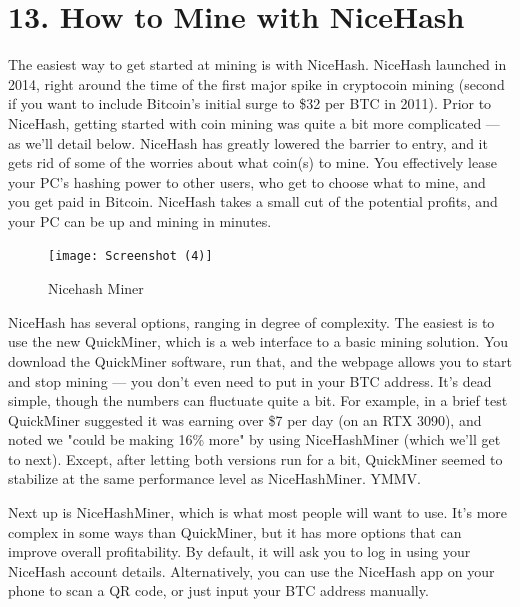 \section*{13. How to Mine with NiceHash }

The easiest way to get started at mining is with NiceHash. NiceHash launched in 2014, right around the time of the first major spike in cryptocoin mining (second if you want to include Bitcoin's initial surge to \$32 per BTC in 2011). Prior to NiceHash, getting started with coin mining was quite a bit more complicated — as we'll detail below. NiceHash has greatly lowered the barrier to entry, and it gets rid of some of the worries about what coin(s) to mine. You effectively lease your PC's hashing power to other users, who get to choose what to mine, and you get paid in Bitcoin. NiceHash takes a small cut of the potential profits, and your PC can be up and mining in minutes.\vspace{.3cm}

\begin{figure}[h]
	\centering
	\texttt{[image: Screenshot (4)]}
	\captionsetup{labelformat=empty}
	\caption{Nicehash Miner}
\end{figure}

NiceHash has several options, ranging in degree of complexity. The easiest is to use the new QuickMiner, which is a web interface to a basic mining solution. You download the QuickMiner software, run that, and the webpage allows you to start and stop mining — you don't even need to put in your BTC address. It's dead simple, though the numbers can fluctuate quite a bit. For example, in a brief test QuickMiner suggested it was earning over \$7 per day (on an RTX 3090), and noted we "could be making 16\% more" by using NiceHashMiner (which we'll get to next). Except, after letting both versions run for a bit, QuickMiner seemed to stabilize at the same performance level as NiceHashMiner. YMMV.\vspace{.3cm}

Next up is NiceHashMiner, which is what most people will want to use. It's more complex in some ways than QuickMiner, but it has more options that can improve overall profitability. By default, it will ask you to log in using your NiceHash account details. Alternatively, you can use the NiceHash app on your phone to scan a QR code, or just input your BTC address manually.\vspace{.3cm}

